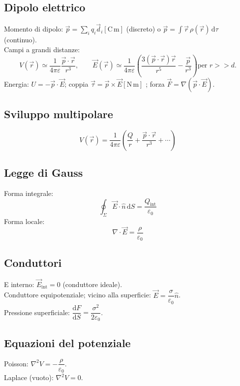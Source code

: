 \documentclass{book}
\begin{document}
\subsection*{Dipolo elettrico}
Momento di dipolo: $\vec{p}=\sum_i q_i\vec{d}_i \left[ \mathrm{C\,m} \right]$ (discreto) o $\vec{p}=\int \vec{r}\,\rho(\vec{r})\,\mathrm{d}\tau$ (continuo).\\
Campi a grandi distanze:
\[V(\vec{r}) \simeq \dfrac{1}{4\pi\varepsilon}\dfrac{\vec{p}\cdot\vec{r}}{r^3},  \qquad
\vec{E}(\vec{r}) \simeq \dfrac{1}{4\pi\varepsilon}\left(\dfrac{3(\vec{p}\cdot\vec{r})\vec{r}}{r^5}-\dfrac{\vec{p}}{r^3}\right) \text{per } r>>d.\]
Energia: $U=-\vec{p}\cdot\vec{E}$; coppia $\vec{\tau}=\vec{p}\times\vec{E} \left[ \mathrm{N\,m} \right]$ ; forza $\vec{F}=\nabla(\vec{p}\cdot\vec{E})$.

\subsection*{Sviluppo multipolare}
\[
V(\vec{r})=\dfrac{1}{4\pi\varepsilon}\left(\dfrac{Q}{r}+\dfrac{\vec{p}\cdot\vec{r}}{r^3}+\cdots\right)
\]

\subsection*{Legge di Gauss}
Forma integrale:
\[
\oint_{\Sigma}\vec{E}\cdot\hat{n}\,\mathrm{d}S=\dfrac{Q_{\mathrm{int}}}{\varepsilon_0}
\]
Forma locale: 
\[
\nabla\cdot\vec{E}=\dfrac{\rho}{\varepsilon_0}
\]

\subsection*{Conduttori}
E interno: $\vec{E}_{\mathrm{int}}=0$ (conduttore ideale).\\
Conduttore equipotenziale; vicino alla superficie: $\vec{E}=\dfrac{\sigma}{\varepsilon_0}\hat{n}$.\\
Pressione superficiale: $\dfrac{\mathrm{d}F}{\mathrm{d}S}=\dfrac{\sigma^2}{2\varepsilon_0}$.

\subsection*{Equazioni del potenziale}
Poisson: $\nabla^2 V=-\dfrac{\rho}{\varepsilon_0}$.\\
Laplace (vuoto): $\nabla^2 V=0$.
\end{document}
